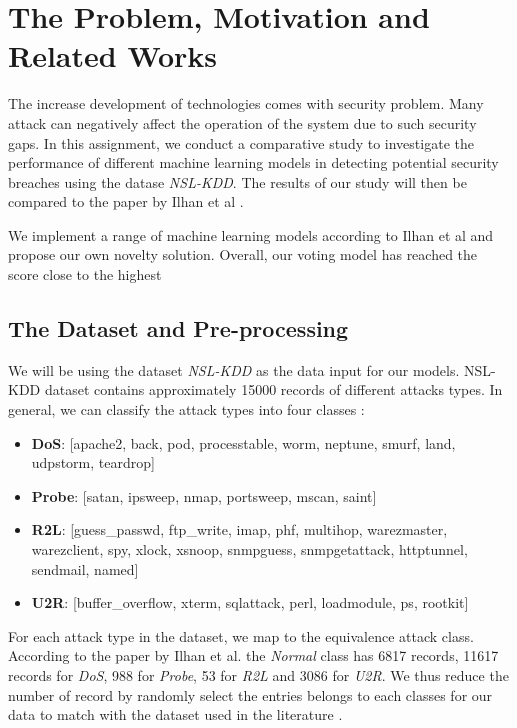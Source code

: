 \section{The Problem, Motivation and Related Works} \label{Sec: Problem}

The increase development of technologies comes with security problem.
Many attack can negatively affect the operation of the system due to such security gaps.
In this assignment, we conduct a comparative study to investigate the performance of different machine learning models in detecting potential security breaches using the datase \emph{NSL-KDD}.
The results of our study will then be compared to the paper by Ilhan et al \cite{kilincer2021machine}.

We implement a range of machine learning models according to Ilhan et al \cite{kilincer2021machine} and propose our own novelty solution.
Overall, our voting model has reached the score close to the highest

\subsection{The Dataset and Pre-processing}
We will be using the dataset \emph{NSL-KDD} as the data input for our models.
NSL-KDD dataset contains approximately 15000 records of different attacks types.
In general, we can classify the attack types into four classes \cite{dhanabal2015study, mahfouz2020comparative}:
\begin{itemize}
    \item \textbf{DoS}: [apache2, back, pod, processtable, worm, neptune, smurf, land, udpstorm, teardrop]
    \item \textbf{Probe}: [satan, ipsweep, nmap, portsweep, mscan, saint]
    \item \textbf{R2L}: [guess\_passwd, ftp\_write, imap, phf, multihop, warezmaster, warezclient, spy, xlock, xsnoop, snmpguess, snmpgetattack, httptunnel, sendmail, named]
    \item \textbf{U2R}: [buffer\_overflow, xterm, sqlattack, perl, loadmodule, ps, rootkit]
\end{itemize}

For each attack type in the dataset, we map to the equivalence attack class.
According to the paper by Ilhan et al. \cite{kilincer2021machine} the \emph{Normal} class has 6817 records,
11617 records for \emph{DoS}, 988 for \emph{Probe}, 53 for \emph{R2L} and 3086 for \emph{U2R}.
We thus reduce the number of record by randomly select the entries belongs to each classes for our data to match with the dataset used in the literature \cite{kilincer2021machine}.

